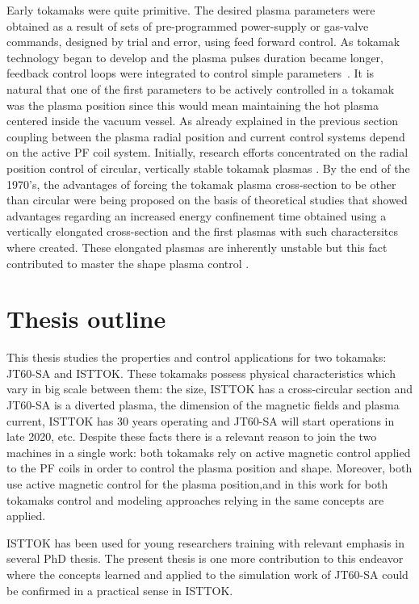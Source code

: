 Early tokamaks were quite primitive. The desired plasma parameters were obtained as a result of sets of pre-programmed power-supply or gas-valve commands, designed by trial and error, using feed forward control. As  tokamak technology began to develop and the plasma pulses duration became longer, feedback control loops were integrated to control simple parameters~\cite{Lister1999}. It is natural that one of the first parameters to be actively controlled in a tokamak was the plasma position since this would mean maintaining the hot plasma centered inside the vacuum vessel. As already explained in the previous section coupling between the plasma radial position and current control systems depend on the active PF coil system. Initially, research efforts concentrated on the radial position control of circular, vertically stable tokamak plasmas \cite[Chapter~1]{PirontiBook}. By the end of the 1970's, the advantages of forcing the tokamak plasma cross-section to be other than circular  were being proposed on the basis of theoretical studies that showed advantages regarding  an increased energy confinement time  obtained using a vertically elongated cross-section and the first plasmas with such charactersitcs where created. These elongated  plasmas are inherently unstable but this fact contributed to master the shape plasma control \cite[Chapter~1]{PirontiBook}. \smallskip



\section{Thesis outline}

This thesis studies the properties and control applications for two tokamaks: JT60-SA and ISTTOK. These tokamaks possess physical characteristics which vary in big scale between them: the size, ISTTOK has a cross-circular section and JT60-SA is a diverted plasma, the dimension of the magnetic fields and plasma current, ISTTOK has 30 years operating and JT60-SA will start operations in late 2020, etc. Despite these facts there is a relevant reason to join the two machines in a single work: both tokamaks rely on active magnetic control applied to the PF coils in order to control the plasma position and shape. Moreover, both use active magnetic control for the plasma position,and in this work for both tokamaks control and modeling approaches relying in the same concepts are applied.   \smallskip

ISTTOK has been used for young researchers training with relevant 
emphasis in several PhD thesis. The present thesis is one more contribution to this endeavor where the concepts learned and applied to the simulation work of JT60-SA  could be confirmed in a practical sense in ISTTOK. \smallskip


